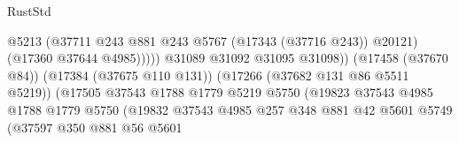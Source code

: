 \begin{lexlean}{RustStd}
\begin{coremodule}
                                                            @5213
                                                            (@37711
                                                              @243
                                                              @881
                                                              @243
                                                              @5767
                                                              (@17343 (@37716 @243))
                                                              @20121)
                                                            (@17360 @37644 @4985)))))
                                                    @31089
                                                    @31092
                                                    @31095
                                                    @31098))
                                                (@17458 (@37670 @84))
                                                (@17384 (@37675 @110 @131))
                                                (@17266 (@37682 @131 @86 @5511 @5219))
                                                (@17505
                                                  @37543
                                                  @1788
                                                  @1779
                                                  @5219
                                                  @5750
                                                  (@19823
                                                    @37543
                                                    @4985
                                                    @1788
                                                    @1779
                                                    @5750
                                                    (@19832
                                                      @37543
                                                      @4985
                                                      @257
                                                      @348
                                                      @881
                                                      @42
                                                      @5601
                                                      @5749
                                                      (@37597
                                                        @350
                                                        @881
                                                        @56
                                                        @5601

\end{coremodule}
\end{lexlean}
